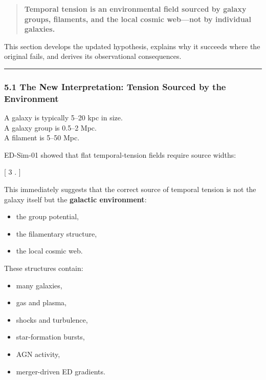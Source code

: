 \begin{quote}
\textbf{Temporal tension is an environmental field sourced by galaxy
groups, filaments, and the local cosmic web---not by individual
galaxies.}
\end{quote}

This section develops the updated hypothesis, explains why it succeeds
where the original fails, and derives its observational consequences.

\begin{center}\rule{0.5\linewidth}{0.5pt}\end{center}

\subsubsection{5.1 The New Interpretation: Tension Sourced by the
Environment}\label{the-new-interpretation-tension-sourced-by-the-environment}

A galaxy is typically 5--20 kpc in size.\\
A galaxy group is 0.5--2 Mpc.\\
A filament is 5--50 Mpc.

ED-Sim-01 showed that flat temporal-tension fields require source
widths:

{[} \sigma {}\text{--}3 .  {]}

This immediately suggests that the correct source of temporal tension is
not the galaxy itself but the \textbf{galactic environment}:

\begin{itemize}
\tightlist
\item
  the group potential,
\item
  the filamentary structure,
\item
  the local cosmic web.
\end{itemize}

These structures contain:

\begin{itemize}
\tightlist
\item
  many galaxies,
\item
  gas and plasma,
\item
  shocks and turbulence,
\item
  star-formation bursts,
\item
  AGN activity,
\item
  merger-driven ED gradients.
\end{itemize}


